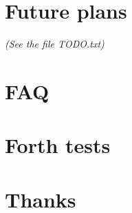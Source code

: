 \documentclass[a4paper,notitlepage]{report}
\begin{document}
\chapter{Future plans}
        \textit{(See the file TODO.txt)}


\appendix

\chapter{FAQ}
        

\chapter{Forth tests}
        

\chapter{Thanks}
        



\printindex
\end{document}
